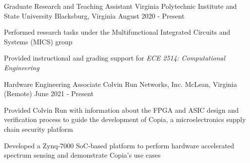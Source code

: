 


\begin{cventries}



\cventry
{Graduate Research and Teaching Assistant} %
{Virginia Polytechnic Institute and State University} %
{Blacksburg, Virginia} %
{August 2020 - Present} %
{ %
\begin{cvitems}
\item {Performed research tasks under the Multifunctional Integrated Circuits and Systems (MICS) group}
\item {Provided instructional and grading support for \textit{ECE 2514: Computational Engineering}}
\end{cvitems}
}



\cventry
{Hardware Engineering Associate} %
{Colvin Run Networks, Inc.} %
{McLean, Virginia (Remote)} %
{June 2021 - Present} %
{
\begin{cvitems}
\item{Provided Colvin Run with information about the FPGA and ASIC design and verification process to guide the development of Copia, a microelectronics supply chain security platform}
\item{Developed a Zynq‑7000 SoC‑based platform to perform
hardware accelerated spectrum sensing and demonstrate Copia’s use cases}
\end{cvitems}
}





\end{cventries}
